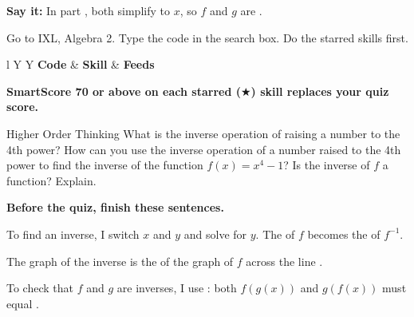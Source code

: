 \vspace{4pt}
\textbf{Say it:} In part \blank[0.8cm], both \blank[2.6cm] simplify to $x$, so $f$ and $g$ are \blank[2.2cm].

\newpage
{}
Go to IXL, Algebra 2. Type the code in the search box. Do the starred skills first.

\vspace{2pt}
\begin{tabularx}{\textwidth}{l Y Y}
\toprule
\textbf{Code} & \textbf{Skill} & \textbf{Feeds} \\
\midrule
{}
\bottomrule
\end{tabularx}

\vspace{4pt}
\textbf{SmartScore 70 or above on each starred ($\bigstar$) skill replaces your quiz score.}

Higher Order Thinking What is the inverse operation of raising a number to the 4th power? How can you use the inverse operation of a number raised to the 4th power to find the inverse of the function $f(x)=x^4-1$? Is the inverse of $f$ a function? Explain.
\lines[5]

\textbf{Before the quiz, finish these sentences.}

To find an inverse, I switch $x$ and $y$ and solve for $y$. The \blank[2.2cm] of $f$ becomes the \blank[2.2cm] of $f^{-1}$.

The graph of the inverse is the \blank[2.6cm] of the graph of $f$ across the line \blank[1.6cm].

To check that $f$ and $g$ are inverses, I use \blank[2.6cm]: both $f(g(x))$ and $g(f(x))$ must equal \blank[1.2cm].


